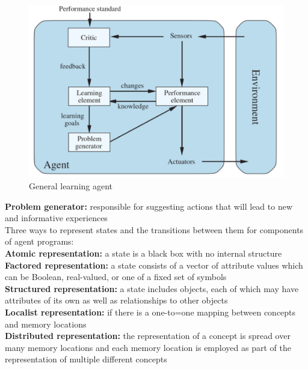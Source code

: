     \begin{figure}[hbt!]
        \centering
        \caption*{General learning agent}
        \includegraphics[scale = 0.75]{Assets/General_Learning_Agent}
    \end{figure}

    \textbf{Problem generator:} responsible for suggesting actions that will lead to new and informative experiences \\

    Three ways to represent states and the transitions between them for components of agent programs: \\
    \textbf{Atomic representation:} a state is a black box with no internal structure \\
    \textbf{Factored representation:} a state consists of a vector of attribute values which can be Boolean, real-valued, or one of a fixed set of symbols \\
    \textbf{Structured representation:} a state includes objects, each of which may have attributes of its own as well as relationships to other objects \\

    \textbf{Localist representation:} if there is a one-to=one mapping between concepts and memory locations \\
    \textbf{Distributed representation:} the representation of a concept is spread over many memory locations and each memory location is employed as part of the representation of multiple different concepts